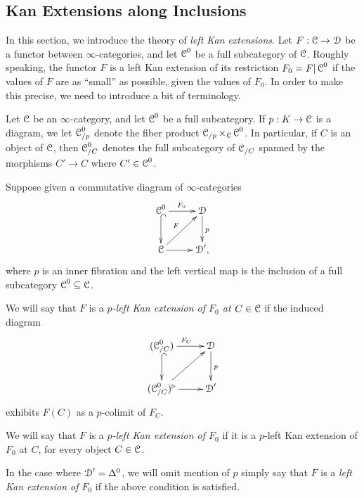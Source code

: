 \subsection{Kan Extensions along Inclusions}\label{kanex}

In this section, we introduce the theory of {\em left Kan extensions}. Let $F: \operatorname{\mathcal{C}} \rightarrow \operatorname{\mathcal{D}}$
be a functor between $\infty$-categories, and let $\operatorname{\mathcal{C}}^{0}$ be a full subcategory of $\operatorname{\mathcal{C}}$.
Roughly speaking, the functor $F$ is a left Kan extension of its restriction $F_0 = F | \operatorname{\mathcal{C}}^{0}$ if
the values of $F$ are as ``small'' as possible, given the values of $F_0$. In order to make this precise, we need to introduce a bit of terminology.

\begin{notation}
Let $\operatorname{\mathcal{C}}$ be an $\infty$-category, and let $\operatorname{\mathcal{C}}^{0}$ be a full subcategory. If $p:
K \rightarrow \operatorname{\mathcal{C}}$ is a diagram, we let $\operatorname{\mathcal{C}}^{0}_{/p}$ denote the fiber product
$\operatorname{\mathcal{C}}_{/p} \times_{ \operatorname{\mathcal{C}}} \operatorname{\mathcal{C}}^{0}$. In particular, if $C$ is an object of $\operatorname{\mathcal{C}}$,
then $\operatorname{\mathcal{C}}^{0}_{/C}$ denotes the full subcategory of $\operatorname{\mathcal{C}}_{/C}$ spanned by the morphisms $C' \rightarrow C$ where $C' \in \operatorname{\mathcal{C}}^{0}$.
\end{notation}

\begin{definition}\label{defKan}
Suppose given a commutative diagram of $\infty$-categories
$$ \xymatrix{ \calC^{0} \ar@{^{(}->}[d] \ar[r]^{F_0} & \calD \ar[d]^{p} \\
\calC \ar[r] \ar[ur]^{F} & \calD', }$$
where $p$ is an inner fibration and
the left vertical map is the inclusion of a full subcategory $\operatorname{\mathcal{C}}^{0} \subseteq \operatorname{\mathcal{C}}$.

We will say that $F$ is a {\it $p$-left Kan extension of $F_0$ at $C \in \operatorname{\mathcal{C}}$} if
the induced diagram
$$ \xymatrix{ (\calC^{0}_{/C}) \ar@{^{(}->}[d] \ar[r]^{F_C} & \calD \ar[d]^{p} \\
(\calC_{/C}^{0})^{\triangleright} \ar[ur] \ar[r] & \calD' }$$
exhibits $F(C)$ as a $p$-colimit of $F_{C}$.

We will say that $F$ is a {\it $p$-left Kan extension of $F_0$} if it is a $p$-left Kan extension
of $F_0$ at $C$, for every object $C \in \operatorname{\mathcal{C}}$.

In the case where $\operatorname{\mathcal{D}}' = \Delta^0$, we will omit mention of $p$ simply say that $F$ is a {\it left Kan extension of $F_0$} if the above condition is satisfied.
\end{definition}

